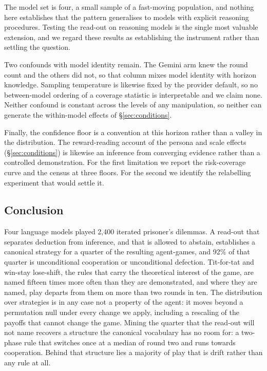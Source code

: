 \documentclass[11pt,a4paper]{article}
\begin{document}
The model set is four, a small sample of a fast-moving population, and nothing
here establishes that the pattern generalises to models with explicit
reasoning procedures. Testing the read-out on reasoning models is the single
most valuable extension, and we regard these results as establishing the
instrument rather than settling the question.

Two confounds with model identity remain. The Gemini arm knew the round count
and the others did not, so that column mixes model identity with horizon
knowledge. Sampling temperature is likewise fixed by the provider default, so
no between-model ordering of a coverage statistic is interpretable and we
claim none. Neither confound is constant across the levels of any
manipulation, so neither can generate the within-model effects of
\S\ref{sec:conditions}.

Finally, the confidence floor is a convention at this horizon rather than a
valley in the distribution. The reward-reading account of the persona and
scale effects (\S\ref{sec:conditions}) is likewise an inference from
converging evidence rather than a controlled demonstration. For the first
limitation we report the risk-coverage curve and the census at three floors.
For the second we identify the relabelling experiment that would settle it.

\subsection{Conclusion}

Four language models played 2{,}400 iterated prisoner's dilemmas. A read-out
that separates deduction from inference, and that is allowed to abstain,
establishes a canonical strategy for a quarter of the resulting agent-games,
and 92\% of that quarter is unconditional cooperation or unconditional
defection. Tit-for-tat and win-stay lose-shift, the rules that carry the
theoretical interest of the game, are named fifteen times more often than they
are demonstrated, and where they are named, play departs from them on more
than two rounds in ten. The distribution over strategies is in any case not a
property of the agent: it moves beyond a permutation null under every change
we apply, including a rescaling of the payoffs that cannot change the game.
Mining the quarter that the read-out will not name recovers a structure the
canonical vocabulary has no room for: a two-phase rule that switches once at a
median of round two and runs towards cooperation. Behind that structure lies a
majority of play that is drift rather than any rule at all.
\end{document}
